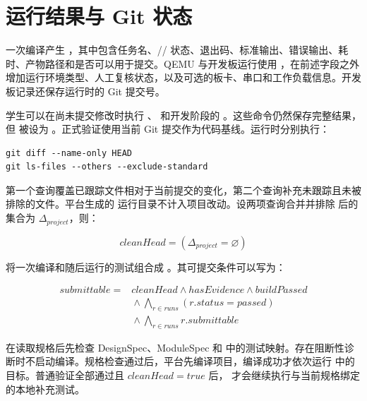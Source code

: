 \section{运行结果与 Git 状态}

一次编译产生 ，其中包含任务名、// 状态、退出码、标准输出、错误输出、耗时、产物路径和是否可以用于提交。QEMU 与开发板运行使用 ，在前述字段之外增加运行环境类型、人工复核状态，以及可选的板卡、串口和工作负载信息。开发板记录还保存运行时的 Git 提交号。

学生可以在尚未提交修改时执行 、 和开发阶段的 。这些命令仍然保存完整结果，但  被设为 。正式验证使用当前 Git 提交作为代码基线。运行时分别执行：

\begin{lstlisting}[language={},caption={项目改动检查所使用的 Git 查询}]
git diff --name-only HEAD
git ls-files --others --exclude-standard
\end{lstlisting}

第一个查询覆盖已跟踪文件相对于当前提交的变化，第二个查询补充未跟踪且未被  排除的文件。平台生成的  运行目录不计入项目改动。设两项查询合并并排除  后的集合为 $\Delta_{project}$，则：

\begin{equation}
  cleanHead = (\Delta_{project} = \varnothing)
\end{equation}

 将一次编译和随后运行的测试组合成 。其可提交条件可以写为：

\begin{equation}
  \begin{aligned}
    submittable ={}& cleanHead \land hasEvidence \land buildPassed \\
    &{}\land \bigwedge_{r \in runs}(r.status=passed) \\
    &{}\land \bigwedge_{r \in runs}r.submittable
  \end{aligned}
\end{equation}

 在读取规格后先检查 DesignSpec、ModuleSpec 和  中的测试映射。存在阻断性诊断时不启动编译。规格检查通过后，平台先编译项目，编译成功才依次运行  中的目标。普通验证全部通过且 $cleanHead=true$ 后， 才会继续执行与当前规格绑定的本地补充测试。

